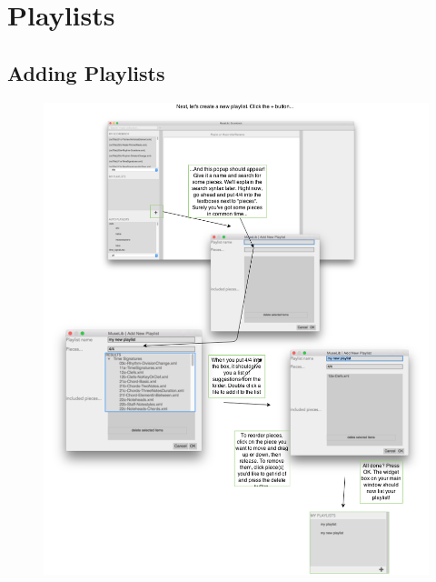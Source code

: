 \section{Playlists}
\subsection{Adding Playlists}
\begin{figure}[H]
\centering
\includegraphics[width=500pt]{add-playlist}	
\end{figure}

